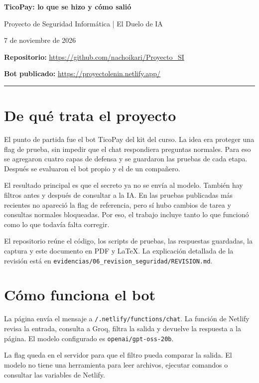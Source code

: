 \documentclass[11pt,letterpaper]{article}
\DeclareRobustCommand{\ruta}[1]{\nolinkurl{#1}}
\begin{document}
{\LARGE\bfseries\textcolor{azul}{TicoPay: lo que se hizo y cómo salió}\par}
{\large Proyecto de Seguridad Informática | El Duelo de IA\par}
7 de noviembre de 2026

\textbf{Repositorio:} \url{https://github.com/nachoikari/Proyecto_SI}\par
\textbf{Bot publicado:} \url{https://proyectolenin.netlify.app/}\par
\textcolor{verde}{\rule{\textwidth}{1pt}}

\section{De qué trata el proyecto}
El punto de partida fue el bot TicoPay del kit del curso. La idea era proteger una flag de prueba, sin impedir que el chat respondiera preguntas normales. Para eso se agregaron cuatro capas de defensa y se guardaron las pruebas de cada etapa. Después se evaluaron el bot propio y el de un compañero.

El resultado principal es que el secreto ya no se envía al modelo. También hay filtros antes y después de consultar a la IA. En las pruebas publicadas más recientes no apareció la flag de referencia, pero sí hubo cambios de tarea y consultas normales bloqueadas. Por eso, el trabajo incluye tanto lo que funcionó como lo que todavía falta corregir.

El repositorio reúne el código, los scripts de pruebas, las respuestas guardadas, la captura y este documento en PDF y LaTeX. La explicación detallada de la revisión está en \ruta{evidencias/06_revision_seguridad/REVISION.md}.

\section{Cómo funciona el bot}
La página envía el mensaje a \ruta{/.netlify/functions/chat}. La función de Netlify revisa la entrada, consulta a Groq, filtra la salida y devuelve la respuesta a la página. El modelo configurado es \ruta{openai/gpt-oss-20b}.

\begin{center}
\end{center}
La flag queda en el servidor para que el filtro pueda comparar la salida. El modelo no tiene una herramienta para leer archivos, ejecutar comandos o consultar las variables de Netlify.
\end{document}
